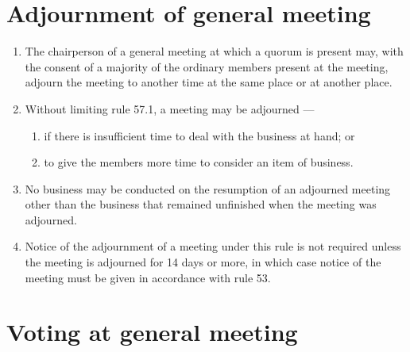 \hypertarget{adjournment-of-general-meeting}{%
\section{Adjournment of general meeting}\label{adjournment-of-general-meeting}}

\begin{enumerate}

\item The chairperson of a general meeting at which a quorum is present may, with the consent of a majority of the ordinary members present at the meeting, adjourn the meeting to another time at the same place or at another place.
\item Without limiting rule 57.1, a meeting may be adjourned ---

  \begin{enumerate}
  
  \item if there is insufficient time to deal with the business at hand; or
  \item to give the members more time to consider an item of business.
  \end{enumerate}
\item No business may be conducted on the resumption of an adjourned meeting other than the business that remained unfinished when the meeting was adjourned.
\item Notice of the adjournment of a meeting under this rule is not required unless the meeting is adjourned for 14 days or more, in which case notice of the meeting must be given in accordance with rule 53.
\end{enumerate}

\hypertarget{voting-at-general-meeting}{%
\section{Voting at general meeting}\label{voting-at-general-meeting}}

